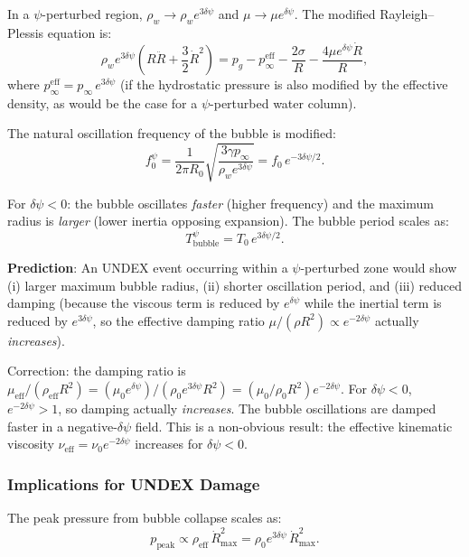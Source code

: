 \documentclass[12pt,twocolumn]{article}
\newcommand{\Reff}{\mathrm{eff}}
\newcommand{\dpsi}{\delta\psi}
\begin{document}
In a $\psi$-perturbed region, $\rho_w \to \rho_w e^{3\dpsi}$ and
$\mu \to \mu e^{\dpsi}$. The modified Rayleigh--Plessis equation is:
\begin{equation}
\rho_w e^{3\dpsi}\!\left(R\ddot{R} + \frac{3}{2}\dot{R}^2\right)
= p_g - p_\infty^\Reff - \frac{2\sigma}{R}
- \frac{4\mu e^{\dpsi}\dot{R}}{R},
\end{equation}
where $p_\infty^\Reff = p_\infty\,e^{3\dpsi}$ (if the hydrostatic
pressure is also modified by the effective density, as would be the case
for a $\psi$-perturbed water column).

The natural oscillation frequency of the bubble is modified:
\begin{equation}
f_0^\psi = \frac{1}{2\pi R_0}\sqrt{\frac{3\gamma p_\infty}
{\rho_w e^{3\dpsi}}} = f_0\,e^{-3\dpsi/2}.
\end{equation}

For $\dpsi < 0$: the bubble oscillates \emph{faster} (higher frequency)
and the maximum radius is \emph{larger} (lower inertia opposing expansion).
The bubble period scales as:
\begin{equation}
T_\mathrm{bubble}^\psi = T_0\,e^{3\dpsi/2}.
\end{equation}

\textbf{Prediction}: An UNDEX event occurring within a $\psi$-perturbed
zone would show (i) larger maximum bubble radius, (ii) shorter oscillation
period, and (iii) reduced damping (because the viscous term is reduced
by $e^{\dpsi}$ while the inertial term is reduced by $e^{3\dpsi}$, so the
effective damping ratio $\mu/(\rho R^2) \propto e^{-2\dpsi}$ actually
\emph{increases}).

Correction: the damping ratio is $\mu_\Reff/(\rho_\Reff R^2) =
(\mu_0 e^{\dpsi})/(\rho_0 e^{3\dpsi} R^2) = (\mu_0/\rho_0 R^2)
e^{-2\dpsi}$. For $\dpsi < 0$, $e^{-2\dpsi} > 1$, so damping actually
\emph{increases}. The bubble oscillations are damped faster in a
negative-$\dpsi$ field. This is a non-obvious result: the effective
kinematic viscosity $\nu_\Reff = \nu_0 e^{-2\dpsi}$ increases for
$\dpsi < 0$.

\subsubsection{Implications for UNDEX Damage}

The peak pressure from bubble collapse scales as:
\begin{equation}
p_\mathrm{peak} \propto \rho_\Reff\,\dot{R}_\mathrm{max}^2
= \rho_0 e^{3\dpsi}\,\dot{R}_\mathrm{max}^2.
\end{equation}
\end{document}

